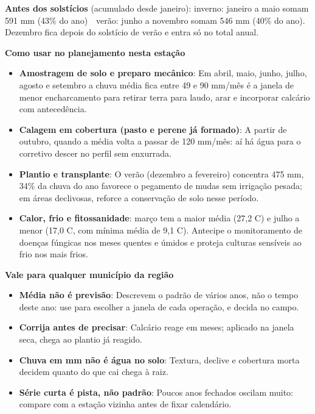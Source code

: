 \documentclass[10pt,a4paper]{article}
\begin{document}
\vspace{1pt}
{\footnotesize\textbf{Antes dos solstícios} (acumulado desde janeiro):
inverno: janeiro a maio somam 591 mm (43\% do ano) \,\textbullet\, verão: junho a novembro somam 546 mm (40\% do ano). Dezembro fica depois do solstício de verão e entra só no total
anual.}

\vspace{2pt}
{\bfseries\small Como usar no planejamento nesta estação}

\footnotesize\begin{itemize}\setlength{\itemsep}{0.5pt}
  \item \textbf{Amostragem de solo e preparo mecânico}: Em abril, maio, junho, julho, agosto e setembro a chuva média fica entre 49 e 90 mm/mês \textemdash{} é a janela de menor encharcamento para retirar terra para laudo, arar e incorporar calcário com antecedência.
  \item \textbf{Calagem em cobertura (pasto e perene já formado)}: A partir de outubro, quando a média volta a passar de 120 mm/mês: aí há água para o corretivo descer no perfil sem enxurrada.
  \item \textbf{Plantio e transplante}: O verão (dezembro a fevereiro) concentra 475 mm, 34\% da chuva do ano \textemdash{} favorece o pegamento de mudas sem irrigação pesada; em áreas declivosas, reforce a conservação de solo nesse período.
  \item \textbf{Calor, frio e fitossanidade}: março tem a maior média (27,2 \textdegree{}C) e julho a menor (17,0 \textdegree{}C, com mínima média de 9,1 \textdegree{}C). Antecipe o monitoramento de doenças fúngicas nos meses quentes e úmidos e proteja culturas sensíveis ao frio nos mais frios.
\end{itemize}

\vspace{1pt}
{\bfseries\small Vale para qualquer município da região}

\scriptsize\begin{itemize}\setlength{\itemsep}{0.5pt}
  \item \textbf{Média não é previsão}: Descrevem o padrão de vários anos, não o tempo deste ano: use para escolher a janela de cada operação, e decida no campo.
  \item \textbf{Corrija antes de precisar}: Calcário reage em meses; aplicado na janela seca, chega ao plantio já reagido.
  \item \textbf{Chuva em mm não é água no solo}: Textura, declive e cobertura morta decidem quanto do que cai chega à raiz.
  \item \textbf{Série curta é pista, não padrão}: Poucos anos fechados oscilam muito: compare com a estação vizinha antes de fixar calendário.
\end{itemize}
\end{document}

